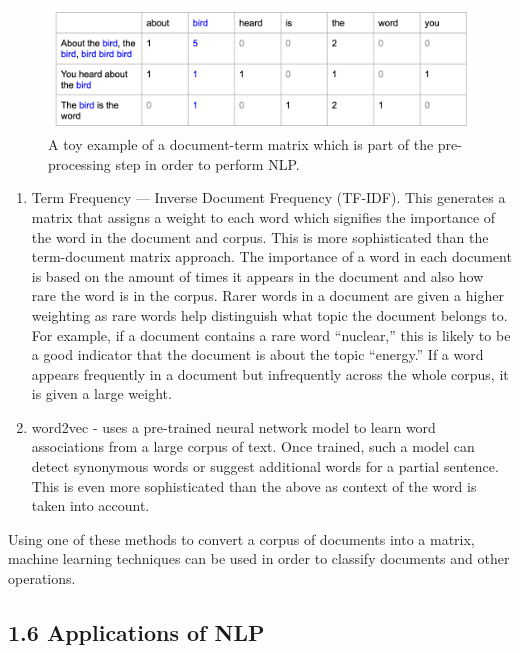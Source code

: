 \documentclass[
]{article}
\begin{document}
\begin{figure}
\includegraphics[width=1\linewidth]{images/16034397439042_surfin bird bow} \caption{A toy example of a document-term matrix which is part of the pre-processing step in order to perform NLP.}\label{fig:bowmat}
\end{figure}

\begin{enumerate}
\def\labelenumi{\arabic{enumi}.}
\setcounter{enumi}{1}
\item
  Term Frequency --- Inverse Document Frequency (TF-IDF). This generates
  a matrix that assigns a weight to each word which signifies the
  importance of the word in the document and corpus. This is more
  sophisticated than the term-document matrix approach. The importance
  of a word in each document is based on the amount of times it appears
  in the document and also how rare the word is in the corpus. Rarer
  words in a document are given a higher weighting as rare words help
  distinguish what topic the document belongs to. For example, if a
  document contains a rare word ``nuclear,'' this is likely to be a good
  indicator that the document is about the topic ``energy.'' If a word
  appears frequently in a document but infrequently across the whole
  corpus, it is given a large weight.
\item
  word2vec - uses a pre-trained neural network model to learn word
  associations from a large corpus of text. Once trained, such a model
  can detect synonymous words or suggest additional words for a partial
  sentence. This is even more sophisticated than the above as context of
  the word is taken into account.
\end{enumerate}

Using one of these methods to convert a corpus of documents into a
matrix, machine learning techniques can be used in order to classify
documents and other operations.

\hypertarget{applications-of-nlp}{%
\subsection{1.6 Applications of NLP}\label{applications-of-nlp}}
\end{document}
